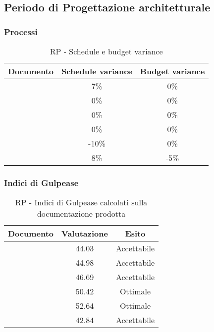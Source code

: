 \documentclass[../PianoDiQualifica.tex]{subfiles}
\begin{document}
		\subsection{Periodo di Progettazione architetturale}
			\subsubsection{Processi}
				\begin{table}[H]
				\center
					\begin{tabular}{|l|c|c|}
						\hline
						\rowcolor{blue!30}\textbf{Documento} & \textbf{Schedule variance} & \textbf{Budget variance} \\ \hline
						\analisideirequisitiRP & 7\% & 0\% \\ \hline
						\glossarioRP & 0\% & 0\% \\ \hline
						\normediprogettoRP & 0\% & 0\% \\ \hline
						\pianodiprogettoRP & 0\% & 0\% \\ \hline
						\pianodiqualificaRP & -10\% & 0\% \\ \hline
						\specificatecnicaRP & 8\% & -5\% \\ \hline
					\end{tabular}
				\caption{RP - Schedule e budget variance}
				\end{table}
			\subsubsection{Indici di Gulpease}
				\begin{table}[H]
				\center
					\begin{tabular}{|l|c|c|}
						\hline
						\rowcolor{blue!30}\textbf{Documento} & \textbf{Valutazione} & \textbf{Esito} \\ \hline
						\analisideirequisitiRP & 44.03 & Accettabile \\ \hline
						\glossarioRP & 44.98 & Accettabile \\ \hline
						\normediprogettoRP & 46.69 & Accettabile \\ \hline
						\pianodiprogettoRP & 50.42 &  Ottimale\\ \hline
						\pianodiqualificaRP & 52.64 & Ottimale \\ \hline
						\specificatecnicaRP & 42.84 & Accettabile \\ \hline
					\end{tabular}
				\caption{RP - Indici di Gulpease calcolati sulla documentazione prodotta}
				\end{table}
\end{document}
